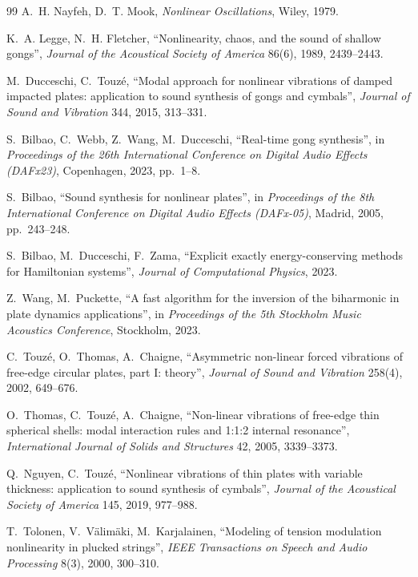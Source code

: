 \documentclass[11pt,a4paper]{article}
\begin{document}
\begin{thebibliography}{99}
 A.~H. Nayfeh, D.~T. Mook, \emph{Nonlinear Oscillations},
  Wiley, 1979.

 K.~A. Legge, N.~H. Fletcher, ``Nonlinearity,
  chaos, and the sound of shallow gongs'', \emph{Journal of the Acoustical
  Society of America} 86(6), 1989, 2439--2443.

 M.~Ducceschi, C.~Touz\'e, ``Modal approach for
  nonlinear vibrations of damped impacted plates: application to sound
  synthesis of gongs and cymbals'', \emph{Journal of Sound and Vibration}
  344, 2015, 313--331.

 S.~Bilbao, C.~Webb, Z.~Wang, M.~Ducceschi,
  ``Real-time gong synthesis'', in \emph{Proceedings of the 26th
  International Conference on Digital Audio Effects (DAFx23)}, Copenhagen,
  2023, pp.~1--8.

 S.~Bilbao, ``Sound synthesis for nonlinear
  plates'', in \emph{Proceedings of the 8th International Conference on
  Digital Audio Effects (DAFx-05)}, Madrid, 2005, pp.~243--248.

 S.~Bilbao, M.~Ducceschi, F.~Zama, ``Explicit exactly
  energy-conserving methods for Hamiltonian systems'', \emph{Journal of
  Computational Physics}, 2023.

 Z.~Wang, M.~Puckette, ``A fast algorithm for the
  inversion of the biharmonic in plate dynamics applications'', in
  \emph{Proceedings of the 5th Stockholm Music Acoustics Conference},
  Stockholm, 2023.

 C.~Touz\'e, O.~Thomas, A.~Chaigne, ``Asymmetric
  non-linear forced vibrations of free-edge circular plates, part I:
  theory'', \emph{Journal of Sound and Vibration} 258(4), 2002, 649--676.

 O.~Thomas, C.~Touz\'e, A.~Chaigne, ``Non-linear
  vibrations of free-edge thin spherical shells: modal interaction rules
  and 1:1:2 internal resonance'', \emph{International Journal of Solids and
  Structures} 42, 2005, 3339--3373.

 Q.~Nguyen, C.~Touz\'e, ``Nonlinear vibrations of
  thin plates with variable thickness: application to sound synthesis of
  cymbals'', \emph{Journal of the Acoustical Society of America} 145, 2019,
  977--988.

 T.~Tolonen, V.~V\"alim\"aki, M.~Karjalainen, ``Modeling
  of tension modulation nonlinearity in plucked strings'', \emph{IEEE
  Transactions on Speech and Audio Processing} 8(3), 2000, 300--310.


\end{thebibliography}
\end{document}
